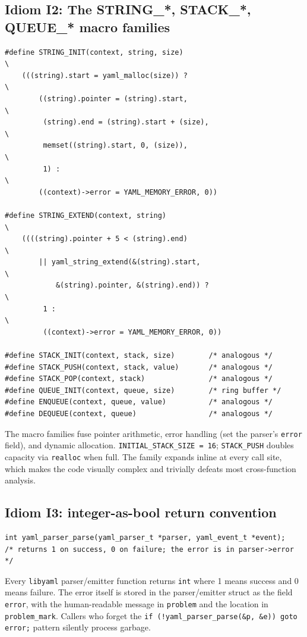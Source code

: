 \documentclass[12pt]{article}
\newcommand{\libyaml}{\texttt{libyaml}}
\theoremstyle{definition}
\theoremstyle{remark}
\begin{document}
\subsection{Idiom I2: The STRING\_*, STACK\_*, QUEUE\_* macro families}
\label{idiom:containers}
\begin{lstlisting}[style=cstyle]
#define STRING_INIT(context, string, size)                              \
    (((string).start = yaml_malloc(size)) ?                             \
        ((string).pointer = (string).start,                             \
         (string).end = (string).start + (size),                        \
         memset((string).start, 0, (size)),                             \
         1) :                                                           \
        ((context)->error = YAML_MEMORY_ERROR, 0))

#define STRING_EXTEND(context, string)                                  \
    ((((string).pointer + 5 < (string).end)                             \
        || yaml_string_extend(&(string).start,                          \
            &(string).pointer, &(string).end)) ?                        \
         1 :                                                            \
         ((context)->error = YAML_MEMORY_ERROR, 0))

#define STACK_INIT(context, stack, size)        /* analogous */
#define STACK_PUSH(context, stack, value)       /* analogous */
#define STACK_POP(context, stack)               /* analogous */
#define QUEUE_INIT(context, queue, size)        /* ring buffer */
#define ENQUEUE(context, queue, value)          /* analogous */
#define DEQUEUE(context, queue)                 /* analogous */
\end{lstlisting}
The macro families fuse pointer arithmetic, error handling (set the parser's \texttt{error} field), and dynamic allocation. \texttt{INITIAL\_STACK\_SIZE = 16}; \texttt{STACK\_PUSH} doubles capacity via \texttt{realloc} when full. The family expands inline at every call site, which makes the code visually complex and trivially defeats most cross-function analysis.

\subsection{Idiom I3: integer-as-bool return convention}
\label{idiom:intbool}
\begin{lstlisting}[style=cstyle]
int yaml_parser_parse(yaml_parser_t *parser, yaml_event_t *event);
/* returns 1 on success, 0 on failure; the error is in parser->error */
\end{lstlisting}
Every \libyaml{} parser/emitter function returns \texttt{int} where 1 means success and 0 means failure. The error itself is stored in the parser/emitter struct as the field \texttt{error}, with the human-readable message in \texttt{problem} and the location in \texttt{problem\_mark}. Callers who forget the \texttt{if (!yaml\_parser\_parse(\&p, \&e)) goto error;} pattern silently process garbage.
\end{document}
